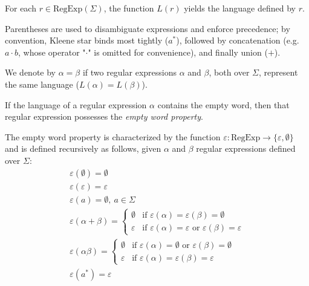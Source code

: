 For each $r \in \text{RegExp}(\Sigma)$, the function $L(r)$ yields the language defined by $r$.

Parentheses are used to disambiguate expressions and enforce precedence; by convention, Kleene star binds most tightly ($a^*$), followed by concatenation (e.g. $a \cdot b$, whose operator "$\cdot$" is omitted for convenience), and finally union ($+$).

We denote by $\alpha = \beta$ if two regular expressions $\alpha$ and $\beta$, both over $\Sigma$, represent the same language ($L(\alpha) = L(\beta)$).

If the language of a regular expression $\alpha$ contains the empty word, then that regular expression possesses the \textit{empty word property}.

\begin{defn}
	The empty word property is characterized by the function $\varepsilon : \text{RegExp} \rightarrow \{ \varepsilon, \emptyset \}$ and is defined recursively as follows, given $\alpha$ and $\beta$ regular expressions defined over $\Sigma$:
	\begin{gather*}
		\varepsilon(\emptyset) = \emptyset \\
		\varepsilon(\varepsilon) = \varepsilon \\
		\varepsilon(a) = \emptyset, \: a \in \Sigma \\
		\varepsilon(\alpha + \beta) = \begin{cases}
			\emptyset & \text{if $\varepsilon(\alpha) = \varepsilon(\beta) = \emptyset$} \\
			\varepsilon & \text{if $\varepsilon(\alpha) = \varepsilon$ or $\varepsilon(\beta) = \varepsilon$}
		\end{cases} \\
		\varepsilon(\alpha \beta) = \begin{cases}
			\emptyset & \text{if $\varepsilon(\alpha) = \emptyset$ or $\varepsilon(\beta) = \emptyset$} \\
			\varepsilon & \text{if $\varepsilon(\alpha) = \varepsilon(\beta) = \varepsilon$}
		\end{cases} \\
		\varepsilon(a^*) = \varepsilon
	\end{gather*}
\end{defn}

